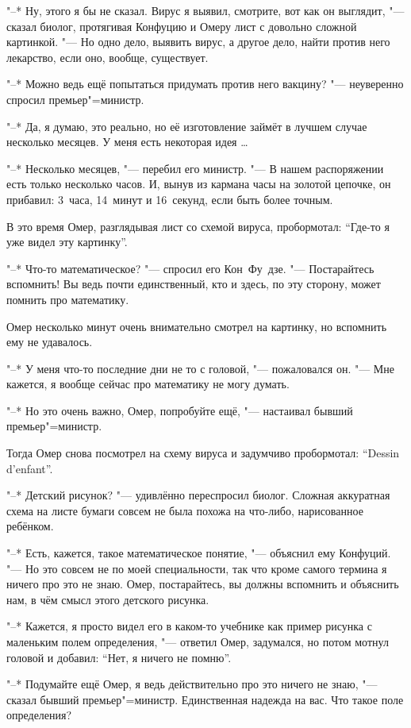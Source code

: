 "--* Ну, этого я бы не сказал.
Вирус я выявил, смотрите, вот как он выглядит, "--- сказал биолог, протягивая
Конфуцию и Омеру лист с довольно сложной картинкой.
"--- Но одно дело, выявить вирус, а другое дело, найти против него лекарство,
если оно, вообще, существует.

"--* Можно ведь ещё попытаться придумать против него вакцину? "--- неуверенно
спросил премьер"=министр.

"--* Да, я думаю, это реально, но её изготовление займёт в лучшем случае
несколько месяцев.
У меня есть некоторая идея \ldots

"--* Несколько месяцев, "--- перебил его министр.
"--- В нашем распоряжении есть только несколько часов.
И, вынув из кармана часы на золотой цепочке, он прибавил: 3~часа, 14~минут и
16~секунд, если быть более точным.

В это время Омер, разглядывая лист со схемой вируса, пробормотал:
\enquote{Где-то я уже видел эту картинку}.

"--* Что-то математическое? "--- спросил его Кон~Фу~дзе.
"--- Постарайтесь вспомнить!
Вы ведь почти единственный, кто и здесь, по эту сторону, может помнить про
математику.

Омер несколько минут очень внимательно смотрел на картинку, но вспомнить ему не
удавалось.

"--* У меня что-то последние дни не то с головой, "--- пожаловался он.
"--- Мне кажется, я вообще сейчас про математику не могу думать.

"--* Но это очень важно, Омер, попробуйте ещё, "--- настаивал бывший
премьер"=министр.

Тогда Омер снова посмотрел на схему вируса и задумчиво пробормотал:
\enquote{\foreignlanguage{french}{Dessin d'enfant}}.

"--* Детский рисунок? "--- удивлённо переспросил биолог.
Сложная аккуратная схема на листе бумаги совсем не была похожа на что-либо,
нарисованное ребёнком.

"--* Есть, кажется, такое математическое понятие, "--- объяснил ему Конфуций.
"--- Но это совсем не по моей специальности, так что кроме самого термина я
ничего про это не знаю.
Омер, постарайтесь, вы должны вспомнить и объяснить нам, в чём смысл этого
детского рисунка.

"--* Кажется, я просто видел его в каком-то учебнике как пример рисунка с
маленьким полем определения, "--- ответил Омер, задумался, но потом мотнул
головой и добавил: \enquote{Нет, я ничего не помню}.

"--* Подумайте ещё Омер, я ведь действительно про это ничего не знаю, "---
сказал бывший премьер"=министр.
Единственная надежда на вас.
Что такое поле определения?

